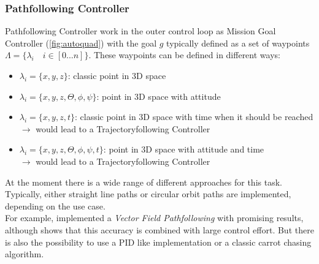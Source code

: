 \subsubsection{Pathfollowing Controller}
Pathfollowing Controller work in the outer control loop as Mission Goal Controller (\cref{fig:autoquad}) with the goal $g$ typically defined as a set of waypoints $\Lambda = \{\lambda_i \quad i \in [0...n]\}$. These waypoints can be defined in different ways:
\begin{itemize}
	\item  $\lambda_i = \{x,y,z\}$: classic point in 3D space
	\item  $\lambda_i = \{x,y,z,\Theta, \phi, \psi\}$: point in 3D space with attitude
	\item  $\lambda_i = \{x,y,z,t\}$: classic point in 3D space with time when it should be reached\\
	$\rightarrow$ would lead to a Trajectoryfollowing Controller
	\item  $\lambda_i = \{x,y,z,\Theta, \phi, \psi, t\}$: point in 3D space with attitude and time\\
	$\rightarrow$ would lead to a Trajectoryfollowing Controller
\end{itemize}
At the moment there is a wide range of different approaches for this task. Typically,
either straight line paths or circular orbit paths are implemented, depending on the use case.\\
For example, \cite{nelson2007vector} implemented a \emph{Vector Field Pathfollowing} with promising results, although \cite{6669680} shows that this accuracy is combined with large control effort. But there is also the possibility to use a PID like implementation or a classic carrot chasing algorithm.\\

\newpage

